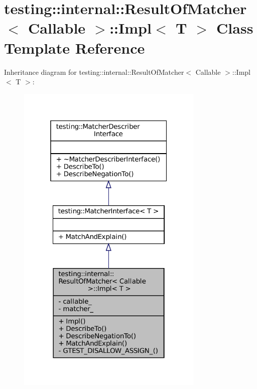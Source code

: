 \hypertarget{classtesting_1_1internal_1_1ResultOfMatcher_1_1Impl}{}\section{testing\+:\+:internal\+:\+:Result\+Of\+Matcher$<$ Callable $>$\+:\+:Impl$<$ T $>$ Class Template Reference}
\label{classtesting_1_1internal_1_1ResultOfMatcher_1_1Impl}


Inheritance diagram for testing\+:\+:internal\+:\+:Result\+Of\+Matcher$<$ Callable $>$\+:\+:Impl$<$ T $>$\+:
\nopagebreak
\begin{figure}[H]
\begin{center}
\leavevmode
\includegraphics[width=253pt]{classtesting_1_1internal_1_1ResultOfMatcher_1_1Impl__inherit__graph}
\end{center}
\end{figure}


